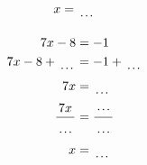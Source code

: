 \documentclass[12pt]{article}
\newcounter{minipagecount}
\begin{document}
\begin{multicols}{2}
\begin{minipage}[t]{0.45\textwidth}
\begin{align*}
        x &= \dotuline{\hspace{5mm}}\\
    \end{align*}
\end{minipage}\columnbreak
\noindent{(\theminipagecount)}\hspace{0.1mm} %
\begin{minipage}[t]{0.45\textwidth} %
    \vspace{-26pt}  %
    \raggedright %
    \begin{align*} %
        7x - 8 &= -1\\
        7x - 8 + \dotuline{\hspace{5mm}} &= -1 + \dotuline{\hspace{5mm}}\\
        7x &= \dotuline{\hspace{5mm}}\\
        \frac{7x}{\dotuline{\hspace{5mm}}} &= \frac{\dotuline{\hspace{5mm}}}{\dotuline{\hspace{5mm}}}\\
        x &= \dotuline{\hspace{5mm}}\\
    \end{align*}
\end{minipage} %
\noindent{(\theminipagecount)}\hspace{0.1mm} %
\begin{minipage}[t]{0.45\textwidth} %
    \vspace{-26pt}  %

\end{minipage}
\end{multicols}
\end{document}
